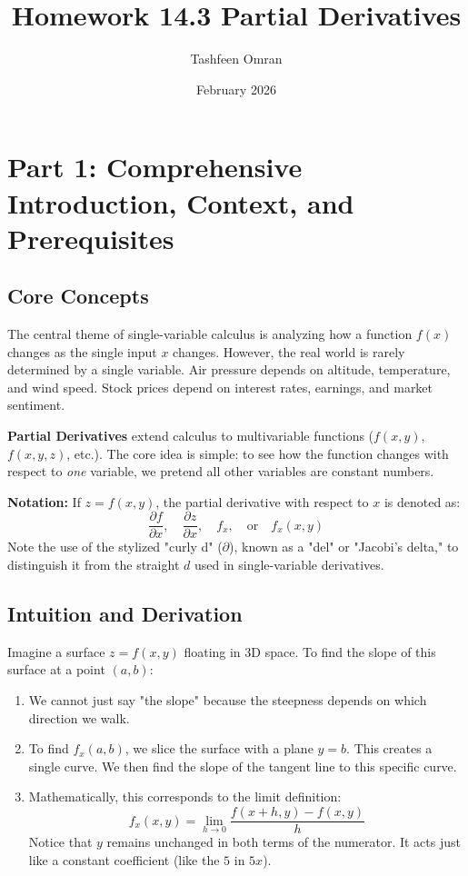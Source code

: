 \documentclass{article}
\title{Homework 14.3 Partial Derivatives}
\author{Tashfeen Omran}
\date{February 2026}
\begin{document}
\maketitle

\section{Part 1: Comprehensive Introduction, Context, and Prerequisites}

\subsection{Core Concepts}
The central theme of single-variable calculus is analyzing how a function $f(x)$ changes as the single input $x$ changes. However, the real world is rarely determined by a single variable. Air pressure depends on altitude, temperature, and wind speed. Stock prices depend on interest rates, earnings, and market sentiment. 

\textbf{Partial Derivatives} extend calculus to multivariable functions ($f(x, y)$, $f(x, y, z)$, etc.). The core idea is simple: to see how the function changes with respect to \textit{one} variable, we pretend all other variables are constant numbers.

\textbf{Notation:}
If $z = f(x, y)$, the partial derivative with respect to $x$ is denoted as:
\[ \frac{\partial f}{\partial x}, \quad \frac{\partial z}{\partial x}, \quad f_x, \quad \text{or} \quad f_x(x, y) \]
Note the use of the stylized "curly d" ($\partial$), known as a "del" or "Jacobi's delta," to distinguish it from the straight $d$ used in single-variable derivatives.

\subsection{Intuition and Derivation}
Imagine a surface $z = f(x,y)$ floating in 3D space. 
To find the slope of this surface at a point $(a, b)$:
\begin{enumerate}
    \item We cannot just say "the slope" because the steepness depends on which direction we walk.
    \item To find $f_x(a, b)$, we slice the surface with a plane $y = b$. This creates a single curve. We then find the slope of the tangent line to this specific curve.
    \item Mathematically, this corresponds to the limit definition:
    \[ f_x(x,y) = \lim_{h \to 0} \frac{f(x+h, y) - f(x, y)}{h} \]
    Notice that $y$ remains unchanged in both terms of the numerator. It acts just like a constant coefficient (like the $5$ in $5x$).
\end{enumerate}
\end{document}
